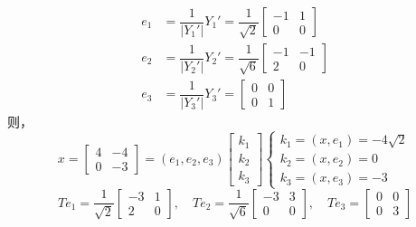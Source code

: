 \documentclass[12pt, a4paper, oneside, fontset=none]{ctexart}
\begin{document}
\begin{align*}
    e_1 & = \dfrac{1}{|Y_1'|}Y_1' = \dfrac{1}{\sqrt{2}}\begin{bmatrix}
                                                           -1 & 1 \\
                                                           0  & 0
                                                       \end{bmatrix} \\
    e_2 & = \dfrac{1}{|Y_2'|}Y_2' = \dfrac{1}{\sqrt{6}}\begin{bmatrix}
                                                           -1 & -1 \\
                                                           2  & 0
                                                       \end{bmatrix} \\
    e_3 & = \dfrac{1}{|Y_3'|}Y_3' = \begin{bmatrix}
                                        0 & 0 \\
                                        0 & 1
                                    \end{bmatrix}
\end{align*}
则，
\[
    x = \begin{bmatrix}
        4 & -4 \\
        0 & -3
    \end{bmatrix} = (e_1,e_2,e_3)\begin{bmatrix}
        k_1 \\
        k_2 \\
        k_3
    \end{bmatrix}
    \begin{cases}
        k_1 = (x,e_1) = -4\sqrt{2} \\
        k_2 = (x,e_2) = 0          \\
        k_3 = (x,e_3) = -3
    \end{cases}
\]
\[
    Te_1 = \dfrac{1}{\sqrt{2}}\begin{bmatrix}
        -3 & 1 \\
        2  & 0
    \end{bmatrix},\quad Te_2 = \dfrac{1}{\sqrt{6}}\begin{bmatrix}
        -3 & 3 \\
        0  & 0
    \end{bmatrix},\quad Te_3 = \begin{bmatrix}
        0 & 0 \\
        0 & 3
    \end{bmatrix}
\]
\end{document}
